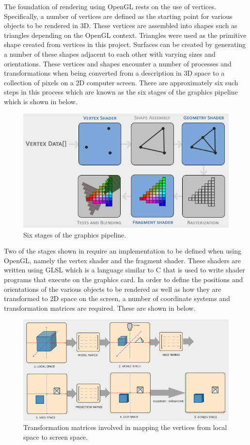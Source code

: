 The foundation of rendering using OpenGL rests on the use of vertices. Specifically, a number of vertices are defined as the starting point for various objects to be rendered in 3D. These vertices are assembled into shapes such as triangles depending on the OpenGL context. Triangles were used as the primitive shape created from vertices in this project. Surfaces can be created by generating a number of these shapes adjacent to each other with varying sizes and orientations. These vertices and shapes encounter a number of processes and transformations when being converted from a description in 3D space to a collection of pixels on a 2D computer screen. There are approximately six such steps in this process which are known as the six stages of the graphics pipeline which is shown in  below.

\begin{figure}[H]
	\centering
	\includegraphics[width=0.7\linewidth]{figures/202110/graphics-pipeline.PNG}
	\caption{Six stages of the graphics pipeline.}
	\label{fig:graphics-pipeline}
\end{figure}

Two of the stages shown in  require an implementation to be defined when using OpenGL, namely the vertex shader and the fragment shader. These shaders are written using \ac{GLSL} which is a language similar to C that is used to write shader programs that execute on the graphics card. In order to define the positions and orientations of the various objects to be rendered as well as how they are transformed to 2D space on the screen, a number of coordinate systems and transformation matrices are required. These are shown in  below.

\begin{figure}[H]
	\centering
	\includegraphics[width=1\linewidth]{figures/202110/transformation-matrices.PNG}
	\caption{Transformation matrices involved in mapping the vertices from local space to screen space.}
	\label{fig:graphics-pipeline}
\end{figure}

